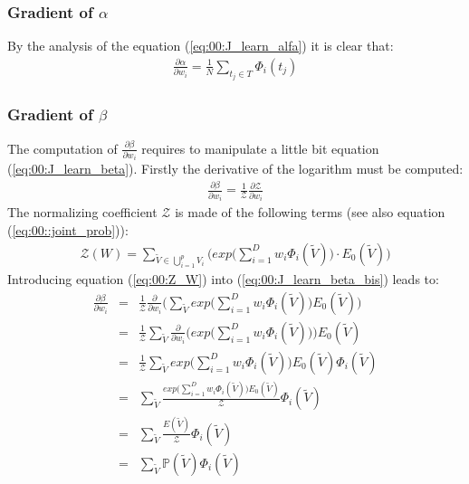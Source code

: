 \subsubsection{Gradient of $\alpha$}

By the analysis of the equation (\ref{eq:00:J_learn_alfa}) it is clear that:
\begin{eqnarray}
\frac{\partial \alpha}{\partial w_i} = \frac{1}{N} \sum _{t_j \in T} \Phi _i(t_j)
\label{eq:00:J_learn_alpha_simplfied}
\end{eqnarray}

\subsubsection{Gradient of $\beta$}
\label{sec:00:beta_unc}

The computation of $\frac{\partial \beta}{\partial w_i}$ requires to manipulate a little bit equation (\ref{eq:00:J_learn_beta}).
Firstly the derivative of the logarithm must be computed:
\begin{eqnarray}
\frac{\partial \beta}{\partial w_i} = \frac{1}{\mathcal{Z}} \frac{\partial \mathcal{Z}}{\partial w_i}
\label{eq:00:J_learn_beta_bis}
\end{eqnarray}
The normalizing coefficient $\mathcal{Z}$ is made of the following terms (see also equation (\ref{eq:00::joint_prob})):
\begin{eqnarray}
\mathcal{Z}(W) = \sum _{ \tilde{V} \in \bigcup_{i=1}^{p} V_i } \bigg( exp \big( \sum _{i=1} ^{D} w_i \Phi _i(\tilde{V}) \big ) \cdot E_0(\tilde{V}) \bigg) 
\label{eq:00:Z_W}
\end{eqnarray} 
Introducing equation (\ref{eq:00:Z_W}) into (\ref{eq:00:J_learn_beta_bis}) leads to:
\begin{eqnarray}
\frac{\partial \beta}{\partial w_i} 
&=& \frac{1}{\mathcal{Z}} \frac{\partial }{\partial w_i} \bigg( \sum_{\tilde{V}} 
exp \big( \sum_{i=1}^{D} w_i \Phi_i(\tilde{V})  \big) E_0(\tilde{V})  \bigg)  \nonumber\\
&=& \frac{1}{\mathcal{Z}}  \sum_{\tilde{V}} \frac{\partial }{\partial w_i} \bigg( 
exp \big( \sum_{i=1}^{D} w_i \Phi_i(\tilde{V})  \big)\bigg) E_0(\tilde{V})   \nonumber\\
&=& \frac{1}{\mathcal{Z}}  \sum_{\tilde{V}}  
exp \big( \sum_{i=1}^{D} w_i \Phi_i(\tilde{V})  \big)  E_0(\tilde{V}) \Phi_i(\tilde{V})   \nonumber\\
&=&  \sum_{\tilde{V}}  \frac{exp \big( \sum_{i=1}^{D} w_i \Phi_i(\tilde{V})  \big)  E_0(\tilde{V})}{\mathcal{Z}} \Phi_i(\tilde{V})   \nonumber\\ 
&=& \sum_{\tilde{V}}\frac{E(\tilde{V})}{\mathcal{Z}}\Phi_i(\tilde{V}) \nonumber\\
&=& \sum _{  \tilde{V} } \mathbb{P}(\tilde{V}) \Phi _i(\tilde{V})
\end{eqnarray}
